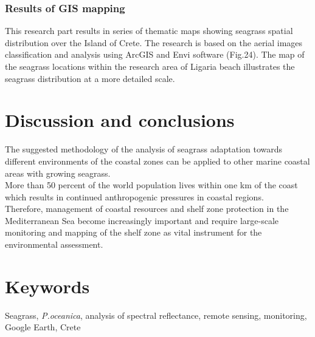 \documentclass[10pt, a4paper]{article}
\begin{document}
\pagebreak

\subsubsection{Results of GIS mapping}
This research part results in series of thematic maps showing seagrass spatial distribution over the Island of
Crete. The research is based on the aerial images classification and analysis using ArcGIS and Envi
software (Fig.24). The map of the seagrass locations within the research area of Ligaria beach illustrates the seagrass
distribution at a more detailed scale.

\pagebreak
\section{Discussion and conclusions}
The suggested methodology of the analysis of seagrass adaptation towards different environments of
the coastal zones can be applied to other marine coastal areas with growing seagrass.\\
More than 50 percent of the world population lives within one km of the coast which results in continued
anthropogenic pressures in coastal regions. \\Therefore, management of coastal resources and shelf
zone protection in the Mediterranean Sea become increasingly important and require large-scale
monitoring and mapping of the shelf zone as vital instrument for the environmental assessment.
\pagebreak

\section{Keywords}
Seagrass, \textit{\textit{P.oceanica}}, analysis of spectral reflectance, remote sensing, monitoring, Google Earth, Crete
\pagebreak
\end{document}

